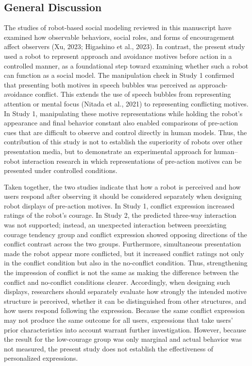\subsection{General Discussion}\label{general-discussion}

The studies of robot-based social modeling reviewed in this manuscript
have examined how observable behaviors, social roles, and forms of
encouragement affect observers (Xu, 2023; Higashino et al., 2023). In
contrast, the present study used a robot to represent approach and
avoidance motives before action in a controlled manner, as a
foundational step toward examining whether such a robot can function as
a social model. The manipulation check in Study 1 confirmed that
presenting both motives in speech bubbles was perceived as
approach-avoidance conflict. This extends the use of speech bubbles from
representing attention or mental focus (Nitada et al., 2021) to
representing conflicting motives. In Study 1, manipulating these motive
representations while holding the robot's appearance and final behavior
constant also enabled comparisons of pre-action cues that are difficult
to observe and control directly in human models. Thus, the contribution
of this study is not to establish the superiority of robots over other
presentation media, but to demonstrate an experimental approach for
human--robot interaction research in which representations of pre-action
motives can be presented under controlled conditions.

Taken together, the two studies indicate that how a robot is perceived
and how users respond after observing it should be considered separately
when designing robot displays of pre-action motives. In Study 1,
conflict expression increased ratings of the robot's courage. In Study
2, the predicted three-way interaction was not supported; instead, an
unexpected interaction between preexisting courage tendency group and
conflict expression showed opposing directions of the conflict contrast
across the two groups. Furthermore, simultaneous presentation made the
robot appear more conflicted, but it increased conflict ratings not only
in the conflict condition but also in the no-conflict condition. Thus,
strengthening the impression of conflict is not the same as making the
difference between the conflict and no-conflict conditions clearer.
Accordingly, when designing such displays, researchers should separately
evaluate how strongly the intended motive structure is perceived,
whether it can be distinguished from other structures, and how users
respond following the expression. Because the same conflict expression
may not produce the same outcome for all users, expressions that take
users' prior characteristics into account warrant further investigation.
However, because the result for the low-courage group was only marginal
and actual behavior was not measured, the present study does not
establish the effectiveness of personalized expressions.

